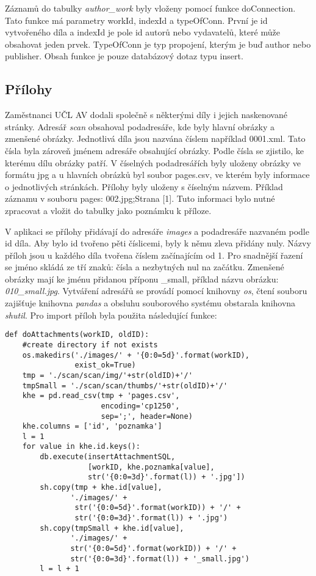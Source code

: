             Záznamů do tabulky \textit{author\_work} byly vloženy pomocí funkce doConnection. Tato funkce má parametry workId, indexId a typeOfConn. První je id vytvořeného díla a indexId je pole id autorů nebo vydavatelů, které může obsahovat jeden prvek. TypeOfConn je typ propojení, kterým je buď author nebo publisher. Obsah funkce je pouze databázový dotaz typu insert.
            
        \subsection{Přílohy}
            Zaměstnanci UČL AV dodali společně s některými díly i jejich naskenované stránky. Adresář \textit{scan} obsahoval  podadresáře, kde byly hlavní obrázky a zmenšené obrázky. Jednotlivá díla jsou nazvána číslem například 0001.xml. Tato čísla byla zároveň jménem adresáře obsahující obrázky. Podle čísla se zjistilo, ke kterému dílu obrázky patří. V číselných podadresářích byly uloženy obrázky ve formátu jpg a u hlavních obrázků byl soubor pages.csv, ve kterém byly informace o jednotlivých stránkách. Přílohy byly uloženy s číselným názvem. Příklad záznamu v souboru pages: 002.jpg;Strana [1]. Tuto informaci bylo nutné zpracovat a vložit do tabulky jako poznámku k příloze. 
            
            V aplikaci se přílohy přidávají do adresáře \textit{images} a podadresáře nazvaném podle id díla. Aby bylo id tvořeno pěti číslicemi, byly k němu zleva přidány nuly. Názvy příloh jsou u každého díla tvořena číslem začínajícím od 1. Pro snadnější řazení se jméno skládá ze tří znaků: čísla a nezbytných nul na začátku. Zmenšené obrázky mají ke jménu přidanou příponu \_small, příklad názvu obrázku: \textit{010\_small.jpg}. Vytváření adresářů se provádí pomocí knihovny \textit{os}, čtení souboru zajišťuje knihovna \textit{pandas} a obsluhu souborového systému obstarala knihovna \textit{shutil}. Pro import příloh byla použita následující funkce:

\pagebreak
            \begin{verbatim}
def doAttachments(workID, oldID):
    #create directory if not exists
    os.makedirs('./images/' + '{0:0=5d}'.format(workID),
                exist_ok=True)
    tmp = './scan/scan/img/'+str(oldID)+'/'
    tmpSmall = './scan/scan/thumbs/'+str(oldID)+'/'
    khe = pd.read_csv(tmp + 'pages.csv',
                      encoding='cp1250',
                      sep=';', header=None)
    khe.columns = ['id', 'poznamka']
    l = 1
    for value in khe.id.keys():
        db.execute(insertAttachmentSQL,
                   [workID, khe.poznamka[value],
                   str('{0:0=3d}'.format(l)) + '.jpg'])
        sh.copy(tmp + khe.id[value], 
               './images/' + 
                str('{0:0=5d}'.format(workID)) + '/' +
                str('{0:0=3d}'.format(l)) + '.jpg')
        sh.copy(tmpSmall + khe.id[value], 
               './images/' + 
               str('{0:0=5d}'.format(workID)) + '/' +
               str('{0:0=3d}'.format(l)) + '_small.jpg')
        l = l + 1
            \end{verbatim}


